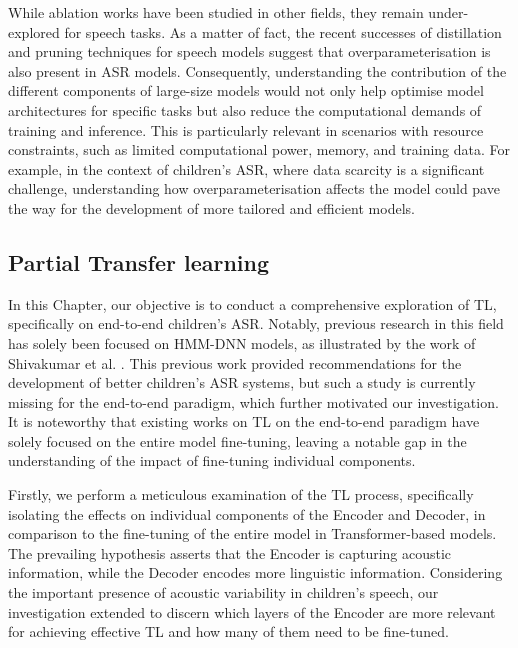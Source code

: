 While ablation works have been studied in other fields, they remain under-explored for speech tasks. As a matter of fact, the recent successes of distillation and pruning techniques for speech models \cite{gandhi2023distilwhisper,chang2022distilhubert,peng23c_interspeech} suggest that overparameterisation is also present in \ac{ASR} models. Consequently, understanding the contribution of the different components of large-size models would not only help optimise model architectures for specific tasks but also reduce the computational demands of training and inference. This is particularly relevant in scenarios with resource constraints, such as limited computational power, memory, and training data. For example, in the context of children's \ac{ASR}, where data scarcity is a significant challenge, understanding how overparameterisation affects the model could pave the way for the development of more tailored and efficient models. %


\subsection{Partial Transfer learning}
In this Chapter, our objective is to conduct a comprehensive exploration of \ac{TL}, specifically on end-to-end children's \ac {ASR}. Notably, previous research in this field has solely been focused on \ac{HMM-DNN} models, as illustrated by the work of Shivakumar et al. \cite{shivakumar2020transfer}. This previous work provided recommendations for the development of better children's \ac{ASR} systems, but such a study is currently missing for the end-to-end paradigm, which further motivated our investigation. It is noteworthy that existing works on \ac{TL} on the end-to-end paradigm have solely focused on the entire model fine-tuning, leaving a notable gap in the understanding of the impact of fine-tuning individual components. 

Firstly, we perform a meticulous examination of the \ac{TL} process, specifically isolating the effects on individual components of the Encoder and Decoder, in comparison to the fine-tuning of the entire model in Transformer-based models. The prevailing hypothesis asserts that the Encoder is capturing acoustic information, while the Decoder encodes more linguistic information. Considering the important presence of acoustic variability in children's speech, our investigation extended to discern which layers of the Encoder are more relevant for achieving effective \ac{TL} and how many of them need to be fine-tuned.


